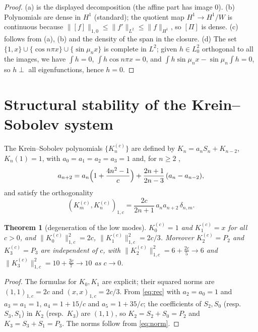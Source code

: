 ﻿\documentclass[11pt]{article}
\newtheorem{theorem}{Theorem}[section]
\begin{document}
\begin{proof}
	(a) is the displayed decomposition (the affine part has image $0$).
	(b) Polynomials are dense in $H^1$ (standard); the quotient map
	$H^1\to H^1/W$ is continuous because
	$\|[f]\|_{1,0}\le\|f'\|_{L^2}\le\|f\|_{H^1}$, so $[\Pi]$ is dense.
	(c) follows from (a), (b) and the density of the span in the closure.
	(d) The set $\{1,x\}\cup\{\cos n\pi x\}\cup\{\sin\mu_n x\}$ is complete
	in $L^2$; given $h\in L^2_0$ orthogonal to all the images, we have
	$\int h=0$, $\int h\cos n\pi x=0$, and
	$\int h\sin\mu_n x-\sin\mu_n\int h=0$, so $h\perp$ all eigenfunctions,
	hence $h=0$.
\end{proof}

\section{Structural stability of the Krein--Sobolev system}

The Krein--Sobolev polynomials $\{K_n^{(c)}\}$ are defined by
$K_n=a_nS_n+K_{n-2}$, $K_n(1)=1$, with $a_0=a_1=a_2=a_3=1$ and, for $n\ge 2$
\cite[eq.~(19)]{axioms},
\begin{equation}
	a_{n+2}=a_n\Bigl(1+\frac{4n^2-1}{c}\Bigr)
	+\frac{2n+1}{2n-3}\,(a_n-a_{n-2}),
	\label{eq:rec}
\end{equation}
and satisfy the orthogonality \cite[Theorem 3]{axioms}
\begin{equation}
	(K_m^{(c)},K_n^{(c)})_{1,c}=\frac{2c}{2n+1}\,a_n a_{n+2}\,\delta_{n,m}.
	\label{eq:norm}
\end{equation}

\begin{theorem}[degeneration of the low modes]\label{thm:low}
	$K_0^{(c)}=1$ and $K_1^{(c)}=x$ for all $c>0$, and
	$\|K_0^{(c)}\|_{1,c}^2=2c$, $\|K_1^{(c)}\|_{1,c}^2=2c/3$.
	Moreover $K_2^{(c)}=P_2$ and $K_3^{(c)}=P_3$ are independent of $c$, with
	$\|K_2^{(c)}\|_{1,c}^2=6+\frac{2c}5\to 6$ and
	$\|K_3^{(c)}\|_{1,c}^2=10+\frac{2c}7\to 10$ as $c\to 0$.
\end{theorem}

\begin{proof}
	The formulas for $K_0,K_1$ are explicit; their squared norms are
	$(1,1)_{1,c}=2c$ and $(x,x)_{1,c}=2c/3$.  From \eqref{eq:rec} with
	$a_2=a_0=1$ and $a_3=a_1=1$,
	$a_4=1+15/c$ and $a_5=1+35/c$; the coefficients of $S_2,S_0$ (resp.\
	$S_3,S_1$) in $K_2$ (resp.\ $K_3$) are $(1,1)$, so
	$K_2=S_2+S_0=P_2$ and $K_3=S_3+S_1=P_3$.  The norms follow from
	\eqref{eq:norm}.
\end{proof}
\end{document}
